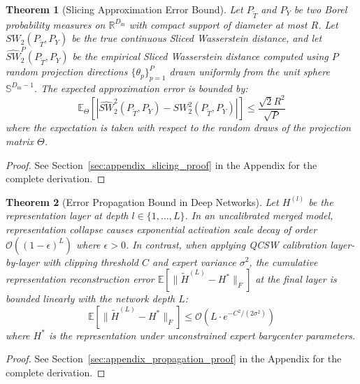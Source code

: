 \documentclass{article}
\theoremstyle{plain}
\newtheorem{theorem}{Theorem}[section]
\theoremstyle{definition}
\theoremstyle{remark}
\begin{document}
\begin{theorem}[Slicing Approximation Error Bound]
\label{thm:slicing_bound}
Let $P_{\tilde{T}}$ and $P_Y$ be two Borel probability measures on $\mathbb{R}^{D_{\text{in}}}$ with compact support of diameter at most $R$. Let $SW_2(P_{\tilde{T}}, P_Y)$ be the true continuous Sliced Wasserstein distance, and let $\widehat{SW}_2^P(P_{\tilde{T}}, P_Y)$ be the empirical Sliced Wasserstein distance computed using $P$ random projection directions $\{\theta_p\}_{p=1}^P$ drawn uniformly from the unit sphere $\mathbb{S}^{D_{\text{in}}-1}$. The expected approximation error is bounded by:
\begin{equation}
\mathbb{E}_{\Theta} \left[ \left| \widehat{SW}_2^2(P_{\tilde{T}}, P_Y) - SW_2^2(P_{\tilde{T}}, P_Y) \right| \right] \le \frac{\sqrt{2} R^2}{\sqrt{P}}
\end{equation}
where the expectation is taken with respect to the random draws of the projection matrix $\Theta$.
\end{theorem}

\begin{proof}
See Section~\ref{sec:appendix_slicing_proof} in the Appendix for the complete derivation.
\end{proof}

\begin{theorem}[Error Propagation Bound in Deep Networks]
\label{thm:deep_propagation}
Let $H^{(l)}$ be the representation layer at depth $l \in \{1, \dots, L\}$. In an uncalibrated merged model, representation collapse causes exponential activation scale decay of order $\mathcal{O}((1 - \epsilon)^L)$ where $\epsilon > 0$. In contrast, when applying QCSW calibration layer-by-layer with clipping threshold $C$ and expert variance $\sigma^2$, the cumulative representation reconstruction error $\mathbb{E}[\|\tilde{H}^{(L)} - H^*\|_F]$ at the final layer is bounded linearly with the network depth $L$:
\begin{equation}
\mathbb{E}[\|\tilde{H}^{(L)} - H^*\|_F] \le \mathcal{O}\left( L \cdot e^{-C^2 / (2\sigma^2)} \right)
\end{equation}
where $H^*$ is the representation under unconstrained expert barycenter parameters.
\end{theorem}

\begin{proof}
See Section~\ref{sec:appendix_propagation_proof} in the Appendix for the complete derivation.
\end{proof}
\end{document}
